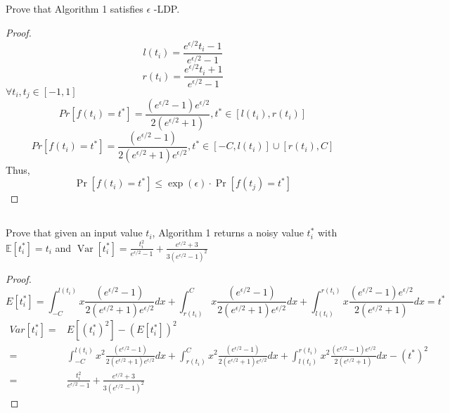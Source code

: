 \documentclass{ctexart}
\begin{document}
\subsection{}
Prove that Algorithm 1 satisfies $\epsilon$ -LDP.
\begin{proof}
    $$l(t_{i})=\frac{e^{\epsilon/2}t_{i}-1}{e^{\epsilon/2}-1}$$
    $$r(t_{i})=\frac{e^{\epsilon/2}t_{i}+1}{e^{\epsilon/2}-1}$$
    $\forall t_{i},t_{j}\in[-1,1]$
    $$Pr[f(t_{i})=t^{*}]=\frac{(e^{\epsilon/2}-1)e^{\epsilon/2}}{2(e^{\epsilon/2}+1)},t^{*}
        \in [l(t_{i}),r(t_{i})]$$
    $$Pr[f(t_{i})=t^{*}]=\frac{(e^{\epsilon/2}-1)}{2(e^{\epsilon/2}+1)e^{\epsilon/2}},t^{*}
        \in [-C,l(t_{i})]\cup [r(t_{i}),C]$$
    Thus,
    $$
        \operatorname{Pr}\left[f(t_{i})=t^{*}\right] \leq \exp (\epsilon) \cdot \operatorname{Pr}\left[f\left(t_{j}\right)=t^{*}\right]
    $$
\end{proof}
\subsection{}
Prove that given an input value $t_{i}$, Algorithm 1 returns a noisy value $t_{i}^{*}$ with $\mathbb{E}\left[t_{i}^{*}\right]=t_{i}$ and $\operatorname{Var}\left[t_{i}^{*}\right]=\frac{t_{i}^{2}}{e^{\epsilon / 2}-1}+\frac{e^{\epsilon / 2}+3}{3\left(e^{\epsilon / 2}-1\right)^{2}}$
\begin{proof}
    $$E[t_{i}^{*}]=\int_{-C}^{l(t_{i})}x\frac{(e^{\epsilon/2}-1)}{2(e^{\epsilon/2}+1)e^{\epsilon/2}}dx+\int_{r(t_{i})}^{C}x\frac{(e^{\epsilon/2}-1)}{2(e^{\epsilon/2}+1)e^{\epsilon/2}}dx+\int_{l(t_{i})}^{r(t_{i})}
        x\frac{(e^{\epsilon/2}-1)e^{\epsilon/2}}{2(e^{\epsilon/2}+1)}dx=t^{*}$$
    $$\begin{aligned}Var[t_{i}^{*}]= & E[(t_{i}^{*})^2]-(E[t_{i}^{*}])^2                                                                    \\
            =               &
            \int_{-C}^{l(t_{i})}x^{2}\frac{(e^{\epsilon/2}-1)}{2(e^{\epsilon/2}+1)e^{\epsilon/2}}dx+\int_{r(t_{i})}^{C}x^{2}\frac{(e^{\epsilon/2}-1)}{2(e^{\epsilon/2}+1)e^{\epsilon/2}}dx+\int_{l(t_{i})}^{r(t_{i})}
            x^{2}\frac{(e^{\epsilon/2}-1)e^{\epsilon/2}}{2(e^{\epsilon/2}+1)}dx-(t^{*})^2                                          \\
            =               & \frac{t_{i}^{2}}{e^{\epsilon / 2}-1}+\frac{e^{\epsilon / 2}+3}{3\left(e^{\epsilon / 2}-1\right)^{2}}\end{aligned}$$

\end{proof}
\end{document}
